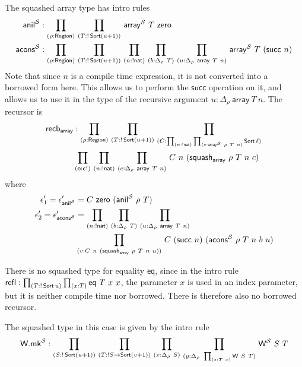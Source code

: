 \begin{eg}[arrays]
	The squashed array type has intro rules
	\begin{align*}
		\mathsf{anil}^{\mathcal S} &: \prd{\rho:\Region}{T:!\Sort(u+1)} \mathsf{array}^{\mathcal S}\ T\ \mathsf{zero} \\
		\mathsf{acons}^{\mathcal S} &: \prd{\rho:\Region}{T:!\Sort(u+1)}{n:!\mathsf{nat}}{b:\Delta_\rho\ T}{u:\Delta_\rho\ \mathsf{array}\ T\ n} \mathsf{array}^{\mathcal S}\ T\ (\mathsf{succ}\ n)
	\end{align*}
	Note that since \( n \) is a compile time expression, it is not converted into a borrowed form here. This allows us to perform the \( \mathsf{succ} \) operation on it, and allows us to use it in the type of the recursive argument \( u:\Delta_\rho\ \mathsf{array}\ T\ n \).
	The recursor is
	\begin{align*}
		\mathsf{recb}_{\mathsf{array}} &: \prd{\rho:\Region}{T:!\Sort(u+1)}{C:\prd{n:!\mathsf{nat}}{c:\mathsf{array}^{\mathcal S}\ \rho\ T\ n}\Sort \ell}\\
		& \prd{\vb e : \bm \epsilon'}{n:!\mathsf{nat}}{c : \Delta_\rho\ \mathsf{array}\ T\ n} C\ n\ (\mathsf{squash}_{\mathsf{array}}\ \rho\ T\ n\ c)
	\end{align*}
	where
	\begin{align*}
		\epsilon_1' = \epsilon_{\mathsf{anil}^{\mathcal S}}' &= C\ \mathsf{zero}\ (\mathsf{anil}^{\mathcal S}\ \rho\ T) \\
		\epsilon_2' = \epsilon_{\mathsf{acons}^{\mathcal S}}' &= \prd{n:!\mathsf{nat}}{b:\Delta_\rho\ T}{u:\Delta_\rho\ \mathsf{array}\ T\ n} \\
		& \prd{(v:C\ n\ (\mathsf{squash}_{\mathsf{array}}\ \rho\ T\ n\ u))} C\ (\mathsf{succ}\ n)\ (\mathsf{acons}^{\mathcal S}\ \rho\ T\ n\ b\ u)
	\end{align*}
\end{eg}
\begin{eg}[equality]
	There is no squashed type for equality \( \mathsf{eq} \), since in the intro rule \( \mathsf{refl} : \prd{T:!\Sort u}{x:T} \mathsf{eq}\ T\ x\ x \), the parameter \( x \) is used in an index parameter, but it is neither compile time nor borrowed. There is therefore also no borrowed recursor.
\end{eg}
\begin{eg}
	The squashed type in this case is given by the intro rule
	\[ \mathsf{W.mk}^{\mathcal S} : \prd{S:!\Sort(u+1)}{T:!S\to\Sort(v+1)}{x:\Delta_\rho\ S}{y:\Delta_\rho\ \prd{z:T\ x}\mathsf{W}\ S\ T} \mathsf{W}^{\mathcal S}\ S\ T \]
\end{eg}
